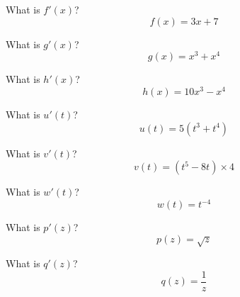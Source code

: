 
\begin{ProblemSet}

 \begin{Problem}
  What is $f'(x)$?
  \begin{equation*}
   f(x) = 3 x + 7
  \end{equation*}
 \end{Problem}

 \begin{Problem}
  What is $g'(x)$?
  \begin{equation*}
   g(x) = x^3 + x^4
  \end{equation*}
 \end{Problem}

 \begin{Problem}
  What is $h'(x)$?
  \begin{equation*}
   h(x) = 10 x^3 - x^4
  \end{equation*}
 \end{Problem}

 \begin{Problem}
  What is $u'(t)$?
  \begin{equation*}
   u(t) = 5 \left(t^3 + t^4\right)
  \end{equation*}
 \end{Problem}

 \begin{Problem}
  What is $v'(t)$?
  \begin{equation*}
   v(t) = \left(t^5 - 8 t\right) \times 4
  \end{equation*}
 \end{Problem}

 \begin{Problem}
  What is $w'(t)$?
  \begin{equation*}
   w(t) = t^{-4}
  \end{equation*}
 \end{Problem}

 \begin{Problem}
  What is $p'(z)$?
  \begin{equation*}
   p(z) = \sqrt{z}
  \end{equation*}
 \end{Problem}

 \begin{Problem}
  What is $q'(z)$?
  \begin{equation*}
   q(z) = \frac{1}{z}
  \end{equation*}
 \end{Problem}


\end{ProblemSet}
